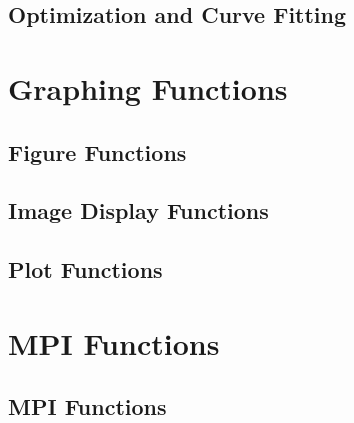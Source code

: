 \documentclass{book}
\begin{document}
\section{Optimization and Curve Fitting}

\chapter{Graphing Functions}
\section{Figure Functions}

\section{Image Display Functions}

\section{Plot Functions}

\chapter{MPI Functions}
\section{MPI Functions}

\end{document}
